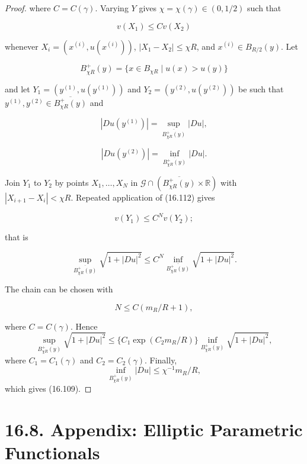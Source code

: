 \begin{proof}
where $C=C(\gamma)$. Varying $Y$ gives $\chi=\chi(\gamma)\in(0,1/2)$ such that

\begin{equation}
\tag{16.112}
v(X_1)\leq Cv(X_2)
\end{equation}

whenever $X_i=(x^{(i)},u(x^{(i)}))$, $|X_1-X_2|\leq\chi R$, and
$x^{(i)}\in B_{R/2}(y)$. Let

\[
B_{\chi R}^{+}(y)=\{x\in B_{\chi R}\mid u(x)>u(y)\}
\]

and let $Y_1=(y^{(1)},u(y^{(1)}))$ and $Y_2=(y^{(2)},u(y^{(2)}))$ be such that $y^{(1)}, y^{(2)}\in \overline{B_{\chi R}^{+}(y)}$
and

\[
|Du(y^{(1)})|=\sup_{\overline{B_{\chi R}^{+}(y)}} |Du|,
\]

\[
|Du(y^{(2)})|=\inf_{\overline{B_{\chi R}^{+}(y)}} |Du|.
\]

Join $Y_1$ to $Y_2$ by points $X_1,\ldots,X_N$ in
$\mathcal G\cap(\overline{B_{\chi R}^{+}(y)}\times\mathbb R)$ with
$|X_{i+1}-X_i|<\chi R$. Repeated application of (16.112) gives

\[
v(Y_1)\leq C^N v(Y_2);
\]

that is

\[
\sup_{\overline{B_{\chi R}^{+}(y)}} \sqrt{1+|Du|^2}\leq C^N \inf_{\overline{B_{\chi R}^{+}(y)}} \sqrt{1+|Du|^2}.
\]

The chain can be chosen with

\[
N\leq C(m_R/R+1),
\]


where $C=C(\gamma)$. Hence
\[
\sup_{B^+_{\chi R}(y)} \sqrt{1+|Du|^2}\leq \{C_1 \exp(C_2 m_R/R)\} \inf_{B^+_{\chi R}(y)} \sqrt{1+|Du|^2},
\]
where $C_1=C_1(\gamma)$ and $C_2=C_2(\gamma)$. Finally,
\[
\inf_{B^+_{\chi R}(y)} |Du|\leq \chi^{-1} m_R/R,
\]
which gives (16.109).
\end{proof}

\section*{16.8. Appendix: Elliptic Parametric Functionals}


